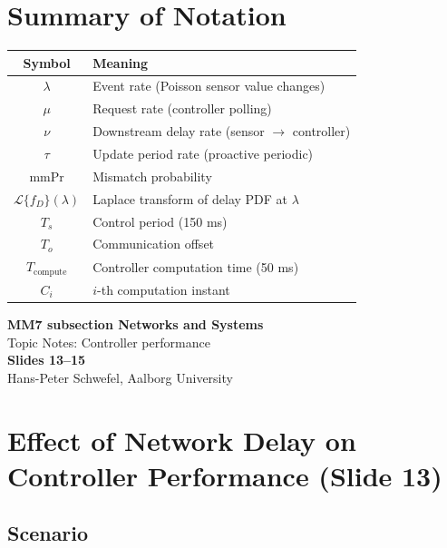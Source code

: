 \section*{Summary of Notation}
 
\begin{center}
\begin{tabular}{cl}
  \toprule
  \textbf{Symbol} & \textbf{Meaning} \\
  \midrule
  $\lambda$ & Event rate (Poisson sensor value changes) \\
  $\mu$     & Request rate (controller polling) \\
  $\nu$     & Downstream delay rate (sensor $\to$ controller) \\
  $\tau$    & Update period rate (proactive periodic) \\
  $\mathrm{mmPr}$ & Mismatch probability \\
  $\mathcal{L}\{f_D\}(\lambda)$ & Laplace transform of delay PDF at $\lambda$ \\
  $T_s$     & Control period (150 ms) \\
  $T_o$     & Communication offset \\
  $T_{\text{compute}}$ & Controller computation time (50 ms) \\
  $C_i$     & $i$-th computation instant \\
  \bottomrule
\end{tabular}
\end{center}
\clearpage

\begin{center}
  {\LARGE\bfseries\color{aaublue}
    MM7 subsection Networks and Systems}\\[0.4em]
  {\large\color{accentgray}
    Topic Notes: Controller performance}\\[0.2em]
  {\large\bfseries Slides 13--15}\\[0.3em]
  {\small\color{accentgray}
    Hans-Peter Schwefel, Aalborg University}
\end{center}
\section{Effect of Network Delay on Controller Performance (Slide 13)}
 
\subsection{Scenario}
 

